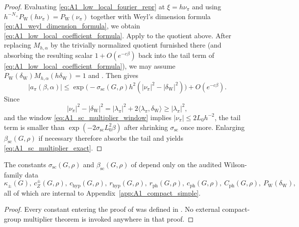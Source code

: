 \begin{proof}
Evaluating \eqref{eq:A1_low_local_fourier_repr} at $\xi=h\nu_\pi$ and using
$h^{-N_+}P_{\mathrm W}(h\nu_\pi)=P_{\mathrm W}(\nu_\pi)$ together with Weyl's dimension formula \eqref{eq:A1_weyl_dimension_formula}, we obtain \eqref{eq:A1_low_local_coefficient_formula}.
Apply  to the quotient above.
After replacing $M_{h,\alpha}$ by the trivially normalized quotient furnished there
(and absorbing the resulting scalar $1+O(e^{-c\beta})$ back into the tail term of \eqref{eq:A1_low_local_coefficient_formula}), we may assume
$P_{\mathrm W}(\delta_{\mathrm W})M_{h,\alpha}(h\delta_{\mathrm W})=1$ and .
Then  gives
\[
|a_\pi(\beta,\alpha)|
\le
\exp\!\bigl(-\sigma_{\mathrm{sc}}(G,\rho)h^2(|\nu_\pi|^2-|\delta_{\mathrm W}|^2)\bigr)
+O(e^{-c\beta}).
\]
Since
\[
|\nu_\pi|^2-|\delta_{\mathrm W}|^2
=
|\lambda_\pi|^2+2\langle \lambda_\pi,\delta_{\mathrm W}\rangle
\ge |\lambda_\pi|^2,
\]
and the window \eqref{eq:A1_sc_multiplier_window} implies $|\nu_\pi|\le 2L_0h^{-2}$, the tail term is smaller than
$\exp(-2\sigma_{\mathrm{sc}}L_0^2\beta)$ after shrinking $\sigma_{\mathrm{sc}}$ once more.
Enlarging $\beta_{\mathrm{sc}}(G,\rho)$ if necessary therefore absorbs the tail and yields \eqref{eq:A1_sc_multiplier_exact}.
\end{proof}

\begin{corollary}\label{cor:A1_low_regime_exact_theorem_entry}
The constants $\sigma_{\mathrm{sc}}(G,\rho)$ and $\beta_{\mathrm{sc}}(G,\rho)$ of
 depend only on the audited Wilson-family data
\[
\kappa_\pm(G),\ c_Z^\pm(G,\rho),\ c_{\mathrm{hyp}}(G,\rho),\ r_{\mathrm{hyp}}(G,\rho),
\ r_{\mathrm{ph}}(G,\rho),\ c_{\mathrm{ph}}(G,\rho),\ C_{\mathrm{ph}}(G,\rho),
\ P_{\mathrm W}(\delta_{\mathrm W}),
\]
all of which are internal to Appendix~\ref{app:A1_compact_simple}.
\end{corollary}

\begin{proof}
Every constant entering the proof of  was defined in
.
No external compact-group multiplier theorem is invoked anywhere in that proof.
\end{proof}

